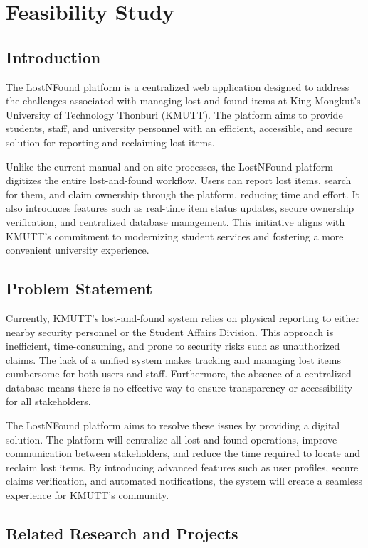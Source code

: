 \chapter{Feasibility Study}

\section{Introduction}
The LostNFound platform is a centralized web application designed to address the challenges associated with managing lost-and-found items at King Mongkut's University of Technology Thonburi (KMUTT). The platform aims to provide students, staff, and university personnel with an efficient, accessible, and secure solution for reporting and reclaiming lost items.

Unlike the current manual and on-site processes, the LostNFound platform digitizes the entire lost-and-found workflow. Users can report lost items, search for them, and claim ownership through the platform, reducing time and effort. It also introduces features such as real-time item status updates, secure ownership verification, and centralized database management. This initiative aligns with KMUTT’s commitment to modernizing student services and fostering a more convenient university experience.

\section{Problem Statement}
Currently, KMUTT’s lost-and-found system relies on physical reporting to either nearby security personnel or the Student Affairs Division. This approach is inefficient, time-consuming, and prone to security risks such as unauthorized claims. The lack of a unified system makes tracking and managing lost items cumbersome for both users and staff. Furthermore, the absence of a centralized database means there is no effective way to ensure transparency or accessibility for all stakeholders.

The LostNFound platform aims to resolve these issues by providing a digital solution. The platform will centralize all lost-and-found operations, improve communication between stakeholders, and reduce the time required to locate and reclaim lost items. By introducing advanced features such as user profiles, secure claims verification, and automated notifications, the system will create a seamless experience for KMUTT’s community.

\section{Related Research and Projects}
